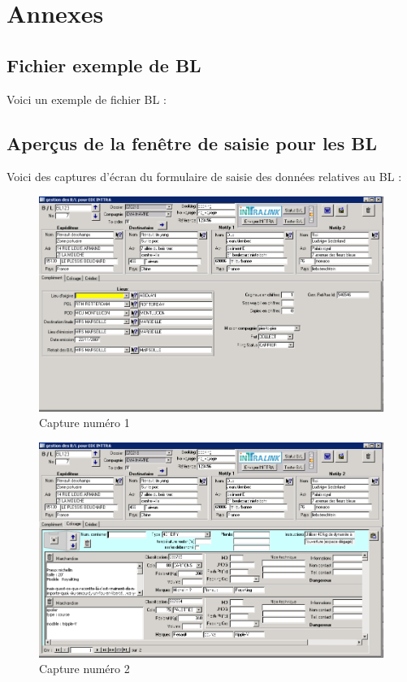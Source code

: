 \part{Annexes}
\chapter{Fichier exemple de BL}

Voici un exemple de fichier BL :


\chapter{Aperçus de la fenêtre de saisie pour les BL}
\label{screenshots}

Voici des captures d'écran du formulaire de saisie des données relatives au BL :
\begin{figure}
	\begin{center}
		\includegraphics[scale=.9, angle=90]{Contenu/Annexes/Images/FormBL_1.png}
	\end{center}

	\caption{Capture numéro 1}
\end{figure}
\begin{figure}
	\begin{center}
		\includegraphics[scale=.9, angle=90]{Contenu/Annexes/Images/FormBL_2.png}
	\end{center}

	\caption{Capture numéro 2}
\end{figure}
